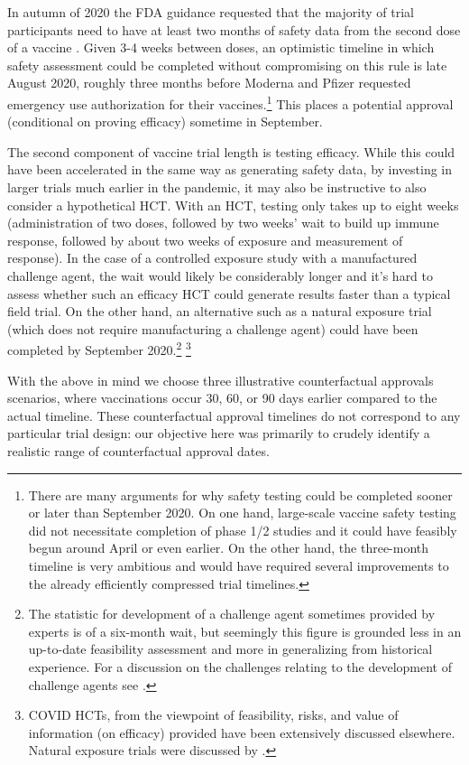 \documentclass{article}
\begin{document}
In autumn of 2020 the FDA guidance requested that the majority of trial participants need to have at least two months of safety data from the second dose of a vaccine \citep{Herper2020Race}. Given 3-4 weeks between doses, an optimistic timeline in which safety assessment could be completed without compromising on this rule is late August 2020, roughly three months before Moderna and Pfizer requested emergency use authorization for their vaccines.\footnote{There are many arguments for why safety testing could be completed sooner or later than September 2020. On one hand, large-scale vaccine safety testing did not necessitate completion of phase 1/2 studies and it could have feasibly begun around April or even earlier. On the other hand, the three-month timeline is very ambitious and would have required several improvements to the already efficiently compressed trial timelines.} This places a potential approval (conditional on proving efficacy) sometime in September.

The second component of vaccine trial length is testing efficacy. While this could have been accelerated in the same way as generating safety data, by investing in larger trials much earlier in the pandemic, it may also be instructive to also consider a hypothetical HCT. With an HCT, testing only takes up to eight weeks (administration of two doses, followed by two weeks' wait to build up immune response, followed by about two weeks of exposure and measurement of response). In the case of a controlled exposure study with a manufactured challenge agent, the wait would likely be considerably longer and it's hard to assess whether such an efficacy HCT could generate results faster than a typical field trial. On the other hand, an alternative such as a natural exposure trial (which does not require manufacturing a challenge agent) could have been completed by September 2020.\footnote{The statistic for development of a challenge agent sometimes provided by experts is of a six-month wait, but seemingly this figure is grounded less in an up-to-date feasibility assessment and more in generalizing from historical experience. For a discussion on the challenges relating to the development of challenge agents see \citet{Williams2023Ethics}.} \footnote{COVID HCTs, from the viewpoint of feasibility, risks, and value of information (on efficacy) provided have been extensively discussed elsewhere. Natural exposure trials were discussed by \citet{Eyal2021Testing}.}

With the above in mind we choose three illustrative counterfactual approvals scenarios, where vaccinations occur 30, 60, or 90 days earlier compared to the actual timeline. These counterfactual approval timelines do not correspond to any particular trial design: our objective here was primarily to crudely identify a realistic range of counterfactual approval dates.
\end{document}
